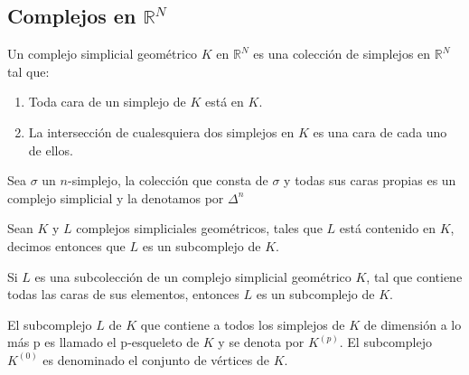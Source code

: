 \subsection{Complejos en $\mathbb{R}^N$}
\begin{Defi}
Un complejo simplicial geométrico $\textit{K}$ en $\mathbb{R}^N$  es una colección de simplejos en $\mathbb{R}^N$ tal que:
\begin{enumerate}
\item Toda cara de un simplejo de $\textit{K}$ está en $\textit{K}$.
\item La intersección de cualesquiera dos simplejos en $\textit{K}$ es una cara de cada uno de ellos.
\end{enumerate} 
\end{Defi}
\begin{Ejem}
Sea $\sigma$ un $n$-simplejo, la colección que consta de $\sigma$ y todas sus caras propias es un complejo simplicial y la denotamos por $\Delta^n$
\end{Ejem} 
\begin{Defi}
Sean $\textit{K}$ y $\textit{L}$ complejos simpliciales geométricos, tales que $\textit{L}$ está contenido en $\textit{K}$, decimos entonces que $\textit{L}$ es un subcomplejo de $\textit{K}$. 
\end{Defi}

\begin{Prop}
Si $\textit{L}$ es una subcolección de un complejo simplicial geométrico $\textit{K}$, tal que contiene todas las caras de sus elementos, entonces $\textit{L}$ es un subcomplejo de $\textit{K}$.
\end{Prop}

\begin{Defi}
El subcomplejo $\textit{L}$ de $\textit{K}$ que contiene a todos los simplejos de $\textit{K}$ de dimensión a lo más p es llamado el p-esqueleto de $\textit{K}$ y se denota por $\textit{K}^{(p)}$. 
El subcomplejo $\textit{K}^{(0)}$ es denominado el conjunto de vértices de $\textit{K}$.
\end{Defi}

